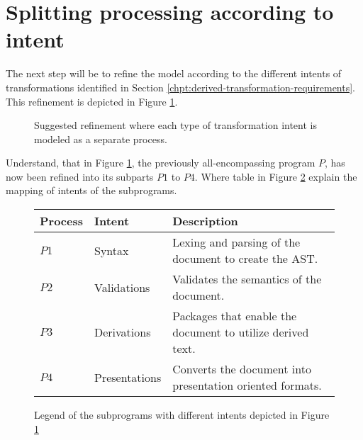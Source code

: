 \documentclass{scrreprt}
\begin{document}
\section{Splitting processing according to intent}
The next step will be to refine the model according to the different intents of transformations identified in Section \ref{chpt:derived-transformation-requirements}. This refinement is depicted in Figure \ref{fig:ideal-only-different-intents}.

\begin{figure}[h]
  \centering


  \caption{Suggested refinement where each type of transformation intent is modeled as a separate process.}
  \label{fig:ideal-only-different-intents}
\end{figure}

Understand, that in Figure \ref{fig:ideal-only-different-intents}, the previously all-encompassing program $P$, has now been refined into its subparts $P1$ to $P4$. Where table in Figure \ref{tbl:ideal-only-different-intents-legend} explain the mapping of intents of the subprograms.


\begin{figure}[h]
\begin{tabular}{l l l}
Process & Intent & Description
\\ \hline

$P1$ & Syntax & Lexing and parsing of the document to create the AST.
\\

$P2$ & Validations & Validates the semantics of the document.
\\

$P3$ & Derivations & Packages that enable the document to utilize derived text.
\\

$P4$ & Presentations & Converts the document into presentation oriented formats.
\\
\end{tabular}
\caption{Legend of the subprograms with different intents depicted in Figure \ref{fig:ideal-only-different-intents}}
\label{tbl:ideal-only-different-intents-legend}
\end{figure}
\end{document}
